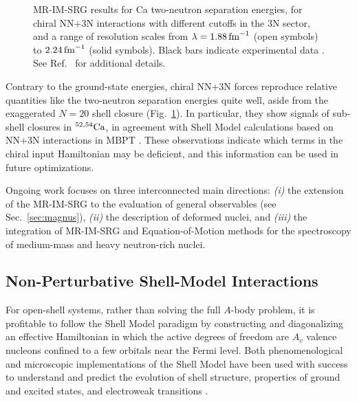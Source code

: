 \begin{figure}[t]
  \setlength{\unitlength}{0.72\textwidth}
  \begin{center}
  \end{center}
  \vspace{-30pt}
  \caption{\label{fig:mrimsrg_CaXX} 
    MR-IM-SRG results for Ca two-neutron separation energies, 
    for chiral NN+3N interactions 
    with different cutoffs in the 3N sector, and a range of resolution scales 
    from $\lambda=1.88\fmi$ (open symbols) to $2.24\fmi$ (solid symbols).
    Black bars indicate experimental data \cite{Wang:2012uq,Wienholtz:2013bh}.
    See Ref.~\cite{Hergert:2014vn} for additional details. 
    }
\end{figure}

Contrary to the ground-state energies, chiral NN+3N forces reproduce
relative quantities like the two-neutron separation energies quite
well, aside from the exaggerated $N=20$ shell closure
(Fig.~\ref{fig:mrimsrg_CaXX}).  In particular, they show signals of
sub-shell closures in $\nuc{Ca}{52,54}$, in agreement with
Shell Model calculations based on NN+3N interactions in MBPT
\cite{Holt:2014vn,Wienholtz:2013bh}. These observations indicate which
terms in the chiral input Hamiltonian may be deficient, and this
information can be used in future optimizations.

Ongoing work focuses on three interconnected main directions:
\emph{(i)} the extension of the MR-IM-SRG to the evaluation of general
observables (see Sec.~\ref{sec:magnus}), \emph{(ii)} the description
of deformed nuclei, and \emph{(iii)} the integration of MR-IM-SRG and
Equation-of-Motion methods \cite{Rowe:1968eq} for the spectroscopy of
medium-mass and heavy neutron-rich nuclei.


\subsection{Non-Perturbative Shell-Model Interactions}
\label{sec:shell_model}

For open-shell systems, rather than solving the full $A$-body problem,
it is profitable to follow the Shell Model paradigm by constructing
and diagonalizing an effective Hamiltonian in which the active degrees
of freedom are $A_v$ valence nucleons confined to a few orbitals near
the Fermi level. Both phenomenological and microscopic
implementations of the Shell Model have been used with success to
understand and predict the evolution of shell structure, properties of
ground and excited states, and electroweak transitions
\cite{Brown:2001rg,Caurier:2005qf,Otsuka:2013vn}.

